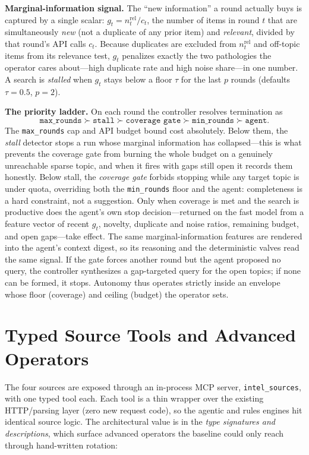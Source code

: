 \documentclass[conference]{IEEEtran}
\newcommand{\code}[1]{\texttt{\small #1}}
\begin{document}
\textbf{Marginal-information signal.} The ``new information'' a round actually buys is captured by a single scalar: $g_t = n^{\text{rel}}_t / c_t$, the number of items in round $t$ that are simultaneously \emph{new} (not a duplicate of any prior item) and \emph{relevant}, divided by that round's API calls $c_t$. Because duplicates are excluded from $n^{\text{rel}}_t$ and off-topic items from its relevance test, $g_t$ penalizes exactly the two pathologies the operator cares about---high duplicate rate and high noise share---in one number. A search is \emph{stalled} when $g_t$ stays below a floor $\tau$ for the last $p$ rounds (defaults $\tau=0.5$, $p=2$).

\textbf{The priority ladder.} On each round the controller resolves termination as
\[
\texttt{max\_rounds} \succ \texttt{stall} \succ \texttt{coverage gate} \succ \texttt{min\_rounds} \succ \texttt{agent}.
\]
The \code{max\_rounds} cap and API budget bound cost absolutely. Below them, the \emph{stall} detector stops a run whose marginal information has collapsed---this is what prevents the coverage gate from burning the whole budget on a genuinely unreachable sparse topic, and when it fires with gaps still open it records them honestly. Below stall, the \emph{coverage gate} forbids stopping while any target topic is under quota, overriding both the \code{min\_rounds} floor and the agent: completeness is a hard constraint, not a suggestion. Only when coverage is met and the search is productive does the agent's own stop decision---returned on the fast model from a feature vector of recent $g_t$, novelty, duplicate and noise ratios, remaining budget, and open gaps---take effect. The same marginal-information features are rendered into the agent's context digest, so its reasoning and the deterministic valves read the same signal. If the gate forces another round but the agent proposed no query, the controller synthesizes a gap-targeted query for the open topics; if none can be formed, it stops. Autonomy thus operates strictly inside an envelope whose floor (coverage) and ceiling (budget) the operator sets.

\section{Typed Source Tools and Advanced Operators}
\label{sec:tools}

The four sources are exposed through an in-process MCP server, \code{intel\_sources}, with one typed tool each. Each tool is a thin wrapper over the existing HTTP/parsing layer (zero new request code), so the agentic and rules engines hit identical source logic. The architectural value is in the \emph{type signatures and descriptions}, which surface advanced operators the baseline could only reach through hand-written rotation:
\end{document}
